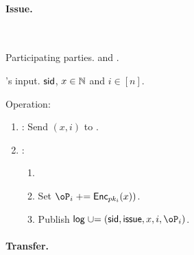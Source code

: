\paragraph{Issue.}
\begin{protocol}~\label{prot:ConfidentialTransactions:Issue}
	\item[Participating parties.] \Ic and \Cc.
	
	
	\item[\Cc's input.] $\mathsf{sid}$, $x\in {\mathbb{N}}$ and $i\in [n]$.
	
	\item[Operation:] ~
	
	
	\begin{enumerate}
		
		\item   \Ic: Send $(x,i)$ to \Cc.
		
		\item \Cc:  
		\begin{enumerate}
			\item {}
			
			\item Set $\oP_i \pluseq \Enc_{pk_i}(x))$.
				
		\item Publish $\historylog \unioneq (\sid,\issue,x,i,\oP_i)$.
				 	
		\end{enumerate}
		
	\end{enumerate}
\end{protocol}

\paragraph{Transfer.}

\newcommand{\RPs}{{\sf rp}}
\newcommand{\rRP}{\cR_\RPs}

\newcommand{\rRPDef}
{
	\set{((pk,A),(a,r))\colon \Enc_{pk}(a;r)= A \sland a\in [\psize]}
}


\newcommand{\Eqs}{{\sf eq}}
\newcommand{\rEQ}{\cR_\Eqs}

\newcommand{\rEQDef}
{
	\set{((pk^0,pk^1,A^0,A^1),(a,r^0,r^1))\colon \forall i\in \zo \; \Enc_{pk^i}(a;r^i)= A^i}
}

\newcommand{\Lrgs}{{\sf lrger}}
\newcommand{\rLrg}{\cR_\Lrgs}

\newcommand{\rLrgDef}
{
	\set{((pk,A^0,A^1),(a^0,r^0,a^1,r^1))\colon \forall i\in \zo \; \Enc_{pk}(a^i;r^i)= A^i \sland a^1 -a^0 \in [q]} 
}

